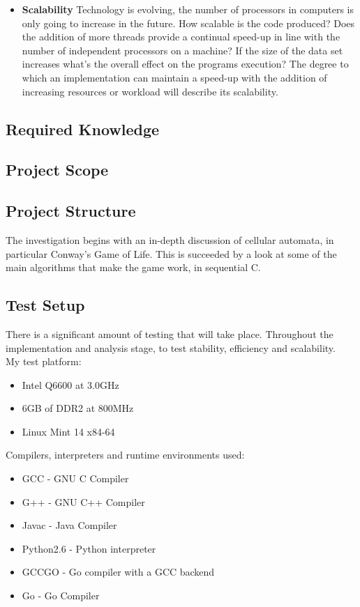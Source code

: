 \documentclass[11pt]{article} %
\begin{document}
\begin{itemize}
\item {\bf Scalability} Technology is evolving, the number of processors in computers is only going to increase in the future. How scalable is the code produced? Does the addition of more threads provide a continual speed-up in line with the number of independent processors on a machine? If the size of the data set increases what's the overall effect on the programs execution? The degree to which an implementation can maintain a speed-up with the addition of increasing resources or workload will describe its scalability.
\end{itemize}
\subsection{Required Knowledge}
\subsection{Project Scope}
\subsection{Project Structure}
The investigation begins with an in-depth discussion of cellular automata, in particular Conway's Game of Life. This is succeeded by a look at some of the main algorithms that make the game work, in sequential C. 
\subsection{Test Setup}
There is a significant amount of testing that will take place. Throughout the implementation and analysis stage, to test stability, efficiency and scalability.
\smallskip
\\My test platform:
\begin{itemize}
\item Intel Q6600 at 3.0GHz
\item 6GB of DDR2 at 800MHz
\item Linux Mint 14 x84-64
\end{itemize} 
Compilers, interpreters and runtime environments used:
\begin{itemize}
\item \gls{GCC} - GNU C Compiler
\item G++ - GNU C++ Compiler
\item Javac - Java Compiler 
\item Python2.6 - Python interpreter
\item GCCGO - Go compiler with a GCC backend
\item Go - Go Compiler
\end{itemize}
\end{document}
